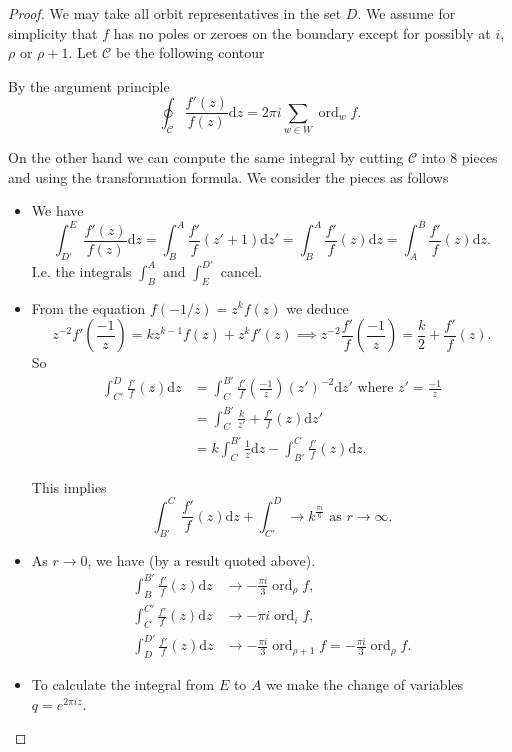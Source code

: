 \documentclass{article}
\theoremstyle{definition}
\DeclareMathOperator{\ord}{ord}
\begin{document}
\begin{proof}
We may take all orbit representatives in the set $D$.
We assume for simplicity that $f$ has no poles or zeroes on the boundary except for possibly at $i$, $\rho$ or $\rho + 1$.
Let $\mathcal{C}$ be the following contour

By the argument principle
\[\oint_{\mathcal{C}}\frac{f'(z)}{f(z)}\mathrm{d}z = 2\pi i \sum_{w\in W}\ord_w f.\]

On  the other hand we can compute the same integral by cutting $\mathcal{C}$ into 8 pieces and using the transformation formula.
We consider the pieces as follows
\begin{itemize}
\item We have
\[\int_{D'}^{E}\frac{f'(z)}{f(z)}\mathrm{d}z = \int_{B}^A \frac{f'}{f}(z' + 1)\mathrm{d}z' = \int_B^A \frac{f'}{f}(z)\mathrm{d}z = \int_A^B \frac{f'}{f}(z)\mathrm{d}z.\]
I.e. the integrals $\int_B^A$ and $\int_E^{D'}$ cancel.
\item From the equation $f(-1/z) = z^kf(z)$ we deduce
\[z^{-2}f'\left(\frac{-1}{z}\right) = kz^{k-1}f(z) + z^k f'(z) \implies z^{-2}\frac{f'}{f}\left(\frac{-1}{z}\right) = \frac{k}{2} + \frac{f'}{f}(z).\]
So
\begin{align*}
\int_{C'}^D \frac{f'}{f}(z)\mathrm{d}z &= \int_C^{B'}\frac{f'}{f}\left(\frac{-1}{z}\right)(z')^{-2}\mathrm{d} z' \text{ where } z' = \frac{-1}{z} \\
&=\int_C^{B'} \frac{k}{z'} + \frac{f'}{f}(z)\mathrm{d}z' \\
&=k\int_C^{B'}\frac{1}{z}\mathrm{d}z - \int_{B'}^C \frac{f'}{f}(z)\mathrm{d}z.
\end{align*}

This implies 
\[\int_{B'}^C\frac{f'}{f}(z)\mathrm{d}z + \int_{C'}^D \to k^{\frac{\pi i}{6}} \text{ as } r\to \infty.\]

\item As $r\to 0$, we have (by a result quoted above).
\begin{align*}
\int_B^{B'} \frac{f'}{f}(z)\mathrm{d}z &\to -\frac{\pi i}{3}\ord_\rho f, \\
\int_C^{C'} \frac{f'}{f}(z)\mathrm{d}z &\to -\pi i\ord_i f, \\
\int_D^{D'} \frac{f'}{f}(z)\mathrm{d}z &\to -\frac{\pi i}{3}\ord_{\rho+1} f = -\frac{\pi i}{3}\ord_\rho f.
\end{align*}

\item To calculate the integral from $E$ to $A$ we make the change of variables $q = e^{2 \pi i z}$.
\end{itemize}
\end{proof}
\end{document}
